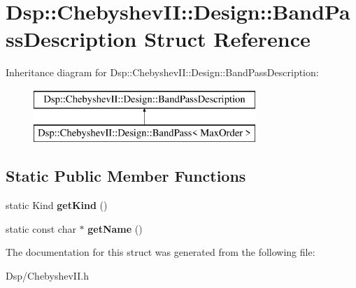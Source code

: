 \hypertarget{structDsp_1_1ChebyshevII_1_1Design_1_1BandPassDescription}{\section{Dsp\-:\-:Chebyshev\-I\-I\-:\-:Design\-:\-:Band\-Pass\-Description Struct Reference}
\label{structDsp_1_1ChebyshevII_1_1Design_1_1BandPassDescription}
}
Inheritance diagram for Dsp\-:\-:Chebyshev\-I\-I\-:\-:Design\-:\-:Band\-Pass\-Description\-:\begin{figure}[H]
\begin{center}
\leavevmode
\includegraphics[height=2.000000cm]{structDsp_1_1ChebyshevII_1_1Design_1_1BandPassDescription}
\end{center}
\end{figure}
\subsection*{Static Public Member Functions}
\begin{DoxyCompactItemize}
\item 
\hypertarget{structDsp_1_1ChebyshevII_1_1Design_1_1BandPassDescription_a1b13447d8c692b37a4ce36b8eb419d53}{static Kind {\bfseries get\-Kind} ()}\label{structDsp_1_1ChebyshevII_1_1Design_1_1BandPassDescription_a1b13447d8c692b37a4ce36b8eb419d53}

\item 
\hypertarget{structDsp_1_1ChebyshevII_1_1Design_1_1BandPassDescription_a8875b2cc33b091d770f14276d96f5be2}{static const char $\ast$ {\bfseries get\-Name} ()}\label{structDsp_1_1ChebyshevII_1_1Design_1_1BandPassDescription_a8875b2cc33b091d770f14276d96f5be2}

\end{DoxyCompactItemize}


The documentation for this struct was generated from the following file\-:\begin{DoxyCompactItemize}
\item 
Dsp/Chebyshev\-I\-I.\-h\end{DoxyCompactItemize}
